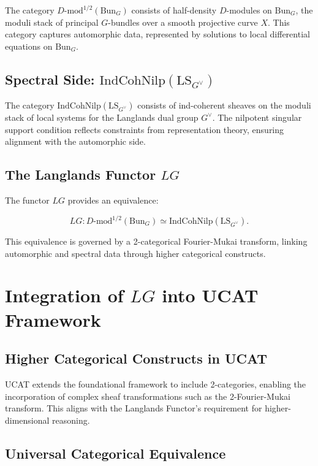 \documentclass{article}
\begin{document}
The category \( D\text{-mod}^{1/2}(\text{Bun}_G) \) consists of half-density \( D \)-modules on \( \text{Bun}_G \), the moduli stack of principal \( G \)-bundles over a smooth projective curve \( X \). This category captures automorphic data, represented by solutions to local differential equations on \( \text{Bun}_G \).

\subsection{Spectral Side: \( \text{IndCohNilp}(\text{LS}_{G^{\vee}}) \)}

The category \( \text{IndCohNilp}(\text{LS}_{G^{\vee}}) \) consists of ind-coherent sheaves on the moduli stack of local systems for the Langlands dual group \( G^{\vee} \). The nilpotent singular support condition reflects constraints from representation theory, ensuring alignment with the automorphic side.

\subsection{The Langlands Functor \( LG \)}

The functor \( LG \) provides an equivalence:

\[
LG : D\text{-mod}^{1/2}(\text{Bun}_G) \simeq \text{IndCohNilp}(\text{LS}_{G^{\vee}}).
\]

This equivalence is governed by a 2-categorical Fourier-Mukai transform, linking automorphic and spectral data through higher categorical constructs.

\section{Integration of \( LG \) into UCAT Framework}

\subsection{Higher Categorical Constructs in UCAT}

UCAT extends the foundational framework to include 2-categories, enabling the incorporation of complex sheaf transformations such as the 2-Fourier-Mukai transform. This aligns with the Langlands Functor's requirement for higher-dimensional reasoning.

\subsection{Universal Categorical Equivalence}
\end{document}
